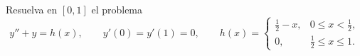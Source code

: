 Resuelva en $[0,1]$ el problema
\[y''+y=h(x),\qquad y'(0)=y'(1)=0,\qquad h(x)=\begin{cases}\tfrac12-x,&0\le x<\tfrac12,\\0,&\tfrac12\le x\le1.\end{cases}\]
